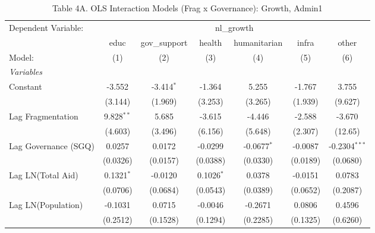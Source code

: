 \par\endgroup



\begin{table}[H]
   \caption{Table 4A. OLS Interaction Models (Frag x Governance): Growth, Admin1}
   \centering
   \begin{tabular}{lcccccc}
      \tabularnewline \midrule \midrule
      Dependent Variable: & \multicolumn{6}{c}{nl\_growth}\\
                                         & educ          & gov\_support  & health       & humanitarian  & infra    & other \\   
      Model:                             & (1)           & (2)           & (3)          & (4)           & (5)      & (6)\\  
      \midrule
      \emph{Variables}\\
      Constant                           & -3.552        & -3.414$^{*}$  & -1.364       & 5.255         & -1.767   & 3.755\\   
                                         & (3.144)       & (1.969)       & (3.253)      & (3.265)       & (1.939)  & (9.627)\\   
      Lag Fragmentation                  & 9.828$^{**}$  & 5.685         & -3.615       & -4.446        & -2.588   & -3.670\\   
                                         & (4.603)       & (3.496)       & (6.156)      & (5.648)       & (2.307)  & (12.65)\\   
      Lag Governance (SGQ)               & 0.0257        & 0.0172        & -0.0299      & -0.0677$^{*}$ & -0.0087  & -0.2304$^{***}$\\   
                                         & (0.0326)      & (0.0157)      & (0.0388)     & (0.0330)      & (0.0189) & (0.0680)\\   
      Lag LN(Total Aid)                  & 0.1321$^{*}$  & -0.0120       & 0.1026$^{*}$ & 0.0378        & -0.0151  & 0.0783\\   
                                         & (0.0706)      & (0.0684)      & (0.0543)     & (0.0389)      & (0.0652) & (0.2087)\\   
      Lag LN(Population)                 & -0.1031       & 0.0715        & -0.0046      & -0.2671       & 0.0806   & 0.4596\\   
                                         & (0.2512)      & (0.1528)      & (0.1294)     & (0.2285)      & (0.1325) & (0.6260)\\   

\end{tabular}
\end{table}
